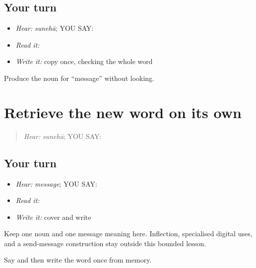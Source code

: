 \subsection*{Your turn}
\begin{itemize}
\raggedright
  \item \emph{Hear:} \emph{sunehā}; YOU SAY: \textbf{}
  \item \emph{Read it:} \textbf{}
  \item \emph{Write it:} copy \textbf{} once, checking the whole word
\end{itemize}

\begin{tcolorbox}[breakable,colback=teal!4,colframe=teal!35!black,title={Before you move on}]
Produce the noun for “message” without looking.
\end{tcolorbox}
\section[\texorpdfstring{\pa{ਸੁਨੇਹਾ} (sunehaa)}{ਸੁਨੇਹਾ (sunehaa)}]{Retrieve the new word on its own}

\label{lesson:PA-C198-suneha-review}



\begin{quote}
\emph{Hear:} \emph{sunehā}; YOU SAY: \textbf{}
\end{quote}

\subsection*{Your turn}
\begin{itemize}
\raggedright
  \item \emph{Hear:} \emph{message}; YOU SAY: \textbf{}
  \item \emph{Read it:} \textbf{}
  \item \emph{Write it:} cover and write \textbf{}
\end{itemize}

\begin{grammarlens}[title={Grammar Lens}]
Keep one noun and one message meaning here. Inflection, specialised digital uses, and a send-message construction stay outside this bounded lesson.
\end{grammarlens}

\begin{tcolorbox}[breakable,colback=teal!4,colframe=teal!35!black,title={Before you move on}]
Say and then write the word once from memory.
\end{tcolorbox}
